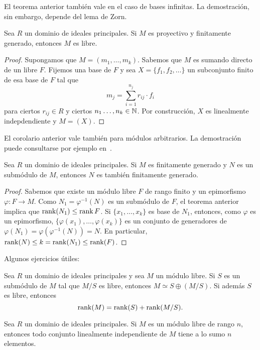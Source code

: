 El teorema anterior también vale en el caso de bases infinitas. La demostración, sin embargo, depende del lema de Zorn.
	
\begin{corollary}
Sea $R$ un dominio de ideales principales. Si $M$ es proyectivo y finitamente generado, 
entonces $M$ es libre.
\end{corollary}

\begin{proof}
Supongamos que $M=(m_1,\dots,m_k)$. Sabemos que $M$ es sumando directo de un libre $F$. Fijemos una base de $F$ y sea 
$X=\{f_1,f_2,\dots\}$ un subconjunto finito de esa base de $F$ tal que
\[
m_j=\sum_{i=1}^{n_j}r_{ij}\cdot f_i
\]
para ciertos $r_{ij}\in R$ y ciertos $n_1\dots,n_k\in\mathbb{N}$. 
Por construcción, $X$ es linealmente indepdendiente y $M=(X)$. 
\end{proof}

El corolario anterior vale también para módulos arbitrarios. La demostración puede
consultarse por ejemplo en~\cite[I, Theorem 5.1]{MR1438546}.

\begin{corollary}
Sea $R$ un dominio de ideales principales. Si $M$ es finitamente generado y $N$ 
es un submódulo de $M$, entonces $N$ es también finitamente generado.  
\end{corollary}

\begin{proof}
Sabemos que existe un módulo libre $F$ de rango finito y un epimorfismo 
$\varphi\colon F\to M$. Como $N_1=\varphi^{-1}(N)$ es un submódulo de $F$, el teorema anterior
implica que 
$\operatorname{rank}(N_1)\leq\operatorname{rank} F$. Si $\{x_1,\dots,x_k\}$ es base de $N_1$, entonces, como $\varphi$ es un epimorfismo, $\{\varphi(x_1),\dots,\varphi(x_k)\}$ es un conjunto de generadores de 
$\varphi(N_1)=\varphi(\varphi^{-1}(N))=N$. En particular, $\operatorname{rank}(N)\leq k=\operatorname{rank}(N_1)\leq\operatorname{rank}(F)$. 
\end{proof}

Algunos ejercicios útiles:

\begin{exercise}
\label{xca:rank}
    Sea $R$ un dominio de ideales principales  
	y sea $M$ un módulo libre. Si 
	$S$ es un submódulo de $M$ tal que $M/S$ es libre, entonces $M\simeq S\oplus (M/S)$. Si además 
	$S$ es libre, entonces 
	\[
	\operatorname{rank}(M)=\operatorname{rank}(S)+\operatorname{rank}(M/S).
	\] 
\end{exercise}

\begin{exercise}
\label{xca:n_elements}
Sea $R$ un dominio de ideales principales. 
Si $M$ es un módulo libre de rango $n$, entonces todo conjunto linealmente independiente de $M$ tiene
a lo sumo $n$ elementos. 
\end{exercise}


